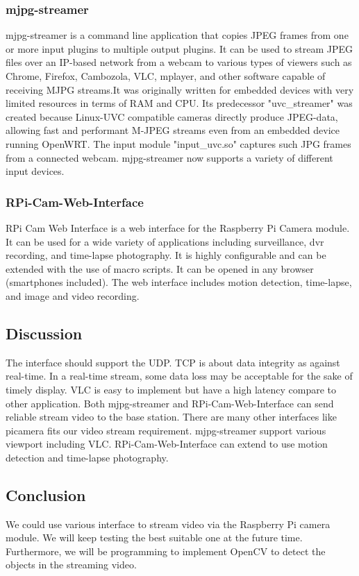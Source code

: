 \documentclass[letterpaper, 10, draftclsnofoot, onecolumn,compsoc]{IEEEtran}
\begin{document}
\subsubsection{ mjpg-streamer }
mjpg-streamer is a command line application that copies JPEG frames from one or more input plugins to multiple output plugins. It can be used to stream JPEG files over an IP-based network from a webcam to various types of viewers such as Chrome, Firefox, Cambozola, VLC, mplayer, and other software capable of receiving MJPG streams.It was originally written for embedded devices with very limited resources in terms of RAM and CPU. Its predecessor "uvc_streamer" was created because Linux-UVC compatible cameras directly produce JPEG-data, allowing fast and performant M-JPEG streams even from an embedded device running OpenWRT. The input module "input_uvc.so" captures such JPG frames from a connected webcam. mjpg-streamer now supports a variety of different input devices. \cite{r6}

\subsubsection{ RPi-Cam-Web-Interface}
RPi Cam Web Interface is a web interface for the Raspberry Pi Camera module. It can be used for a wide variety of applications including surveillance, dvr recording, and time-lapse photography. It is highly configurable and can be extended with the use of macro scripts. It can be opened in any browser (smartphones included). \cite{r9} The web interface includes motion detection, time-lapse, and image and video recording.

\subsection{Discussion}
The interface should support the UDP. TCP is about data integrity as against real-time. In a real-time stream, some data loss may be acceptable for the sake of timely display. VLC is easy to implement but have a high latency compare to other application. Both mjpg-streamer and RPi-Cam-Web-Interface can send reliable stream video to the base station. There are many other interfaces like picamera fits our video stream requirement. mjpg-streamer support various viewport including VLC. RPi-Cam-Web-Interface can extend to use motion detection and time-lapse photography.

\subsection{Conclusion}
We could use various interface to stream video via the Raspberry Pi camera module. We will keep testing the best suitable one at the future time. Furthermore, we will be programming to implement OpenCV to detect the objects in the streaming video.
\end{document}
